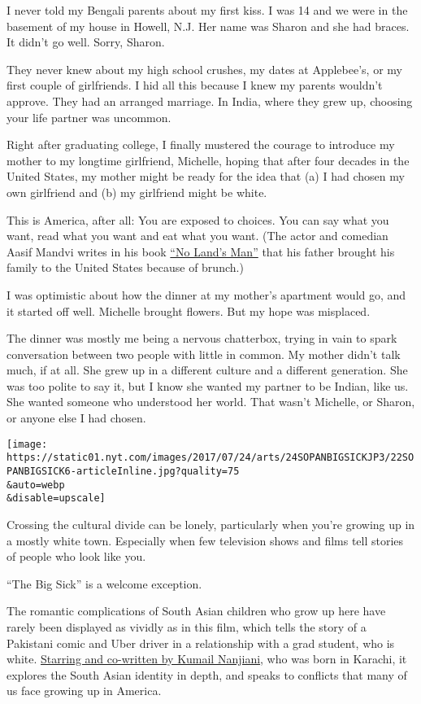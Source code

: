 I never told my Bengali parents about my first kiss. I was 14 and we
were in the basement of my house in Howell, N.J. Her name was Sharon and
she had braces. It didn't go well. Sorry, Sharon.

They never knew about my high school crushes, my dates at Applebee's, or
my first couple of girlfriends. I hid all this because I knew my parents
wouldn't approve. They had an arranged marriage. In India, where they
grew up, choosing your life partner was uncommon.

Right after graduating college, I finally mustered the courage to
introduce my mother to my longtime girlfriend, Michelle, hoping that
after four decades in the United States, my mother might be ready for
the idea that (a) I had chosen my own girlfriend and (b) my girlfriend
might be white.

This is America, after all: You are exposed to choices. You can say what
you want, read what you want and eat what you want. (The actor and
comedian Aasif Mandvi writes in his book
\href{https://www.amazon.com/No-Lands-Man-Perilous-Journey/dp/B00OZ3QUB6}{``No
Land's Man''} that his father brought his family to the United States
because of brunch.)

I was optimistic about how the dinner at my mother's apartment would go,
and it started off well. Michelle brought flowers. But my hope was
misplaced.

The dinner was mostly me being a nervous chatterbox, trying in vain to
spark conversation between two people with little in common. My mother
didn't talk much, if at all. She grew up in a different culture and a
different generation. She was too polite to say it, but I know she
wanted my partner to be Indian, like us. She wanted someone who
understood her world. That wasn't Michelle, or Sharon, or anyone else I
had chosen.

\texttt{[image: https://static01.nyt.com/images/2017/07/24/arts/24SOPANBIGSICKJP3/22SOPANBIGSICK6-articleInline.jpg?quality=75\\\&auto=webp\\\&disable=upscale]}

Crossing the cultural divide can be lonely, particularly when you're
growing up in a mostly white town. Especially when few television shows
and films tell stories of people who look like you.

``The Big Sick'' is a welcome exception.

The romantic complications of South Asian children who grow up here have
rarely been displayed as vividly as in this film, which tells the story
of a Pakistani comic and Uber driver in a relationship with a grad
student, who is white.
\href{https://www.nytimes.com/2017/06/22/movies/the-big-sick-review-kumail-nanjiani.html}{Starring
and co-written by Kumail Nanjiani}, who was born in Karachi, it explores
the South Asian identity in depth, and speaks to conflicts that many of
us face growing up in America.

